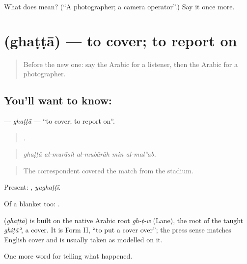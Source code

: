 \begin{tcolorbox}[breakable,colback=teal!4,colframe=teal!35!black,title={Before you move on}]
What does  mean? (\textquotedblleft{}A photographer; a camera operator\textquotedblright{}.) Say it once more.
\end{tcolorbox}
\section[\texorpdfstring{\ar{غطى} (ghaṭṭā)}{غطى (ghaṭṭā)}]{ (ghaṭṭā) — to cover; to report on}

\label{lesson:AR-C356-ghatta}



\begin{quote}
Before the new one: say the Arabic for a listener, then the Arabic for a photographer.
\end{quote}

\subsection*{You'll want to know: }
\textbf{} — \emph{ghaṭṭā} — \textquotedblleft{}to cover; to report on\textquotedblright{}.

\begin{quote}
    .
\end{quote}

\begin{quote}
\emph{ghaṭṭā al-murāsil al-mubārāh min al-malʿab.}
\end{quote}

\begin{quote}
The correspondent covered the match from the stadium.
\end{quote}

Present: , \emph{yughaṭṭī}.

Of a blanket too:   .

\begin{cousinweb}
\textbf{} (\emph{ghaṭṭā}) is built on the native Arabic root \emph{gh-ṭ-w} (Lane), the root of the taught \emph{ghiṭāʾ}, a cover. It is Form II, \textquotedblleft{}to put a cover over\textquotedblright{}; the press sense matches English cover and is usually taken as modelled on it.
\end{cousinweb}

\begin{grammarlens}[title={What you've built}]
One more word for telling what happened.
\end{grammarlens}

